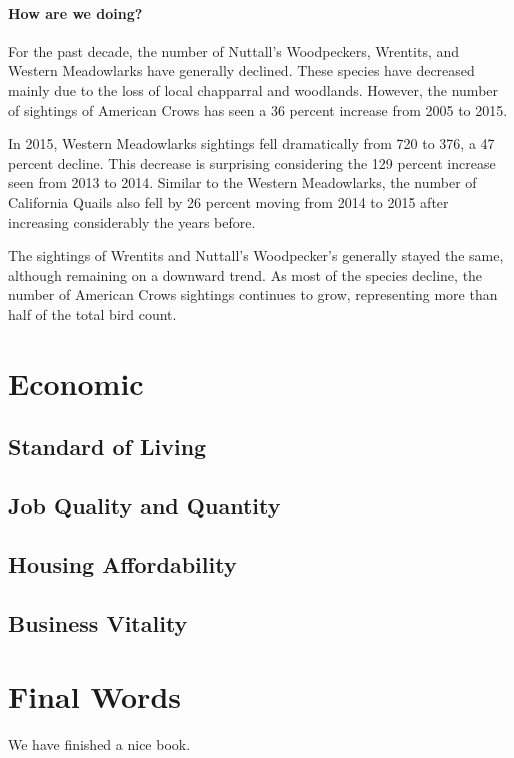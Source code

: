 \documentclass[]{book}
\theoremstyle{definition}
\theoremstyle{definition}
\theoremstyle{definition}
\theoremstyle{remark}
\begin{document}
\subsubsection*{How are we doing?}\label{how-are-we-doing-33}

For the past decade, the number of Nuttall's Woodpeckers, Wrentits, and
Western Meadowlarks have generally declined. These species have
decreased mainly due to the loss of local chapparral and woodlands.
However, the number of sightings of American Crows has seen a 36 percent
increase from 2005 to 2015.

In 2015, Western Meadowlarks sightings fell dramatically from 720 to
376, a 47 percent decline. This decrease is surprising considering the
129 percent increase seen from 2013 to 2014. Similar to the Western
Meadowlarks, the number of California Quails also fell by 26 percent
moving from 2014 to 2015 after increasing considerably the years before.

The sightings of Wrentits and Nuttall's Woodpecker's generally stayed
the same, although remaining on a downward trend. As most of the species
decline, the number of American Crows sightings continues to grow,
representing more than half of the total bird count.

\chapter*{Economic}\label{economic}

\section*{Standard of Living}\label{standard-of-living}

\section*{Job Quality and Quantity}\label{job-quality-and-quantity}

\section*{Housing Affordability}\label{housing-affordability}

\section*{Business Vitality}\label{business-vitality}

\chapter{Final Words}\label{final-words}

We have finished a nice book.


\end{document}
